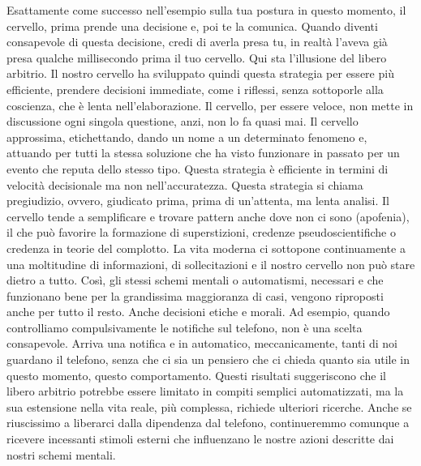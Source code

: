 \documentclass[12pt]{book} %
\begin{document}
Esattamente come successo nell'esempio sulla tua postura in questo momento, il cervello, prima
prende una decisione e, poi te la comunica. Quando diventi consapevole di questa decisione, credi di averla presa tu,
in realtà l'aveva già presa qualche millisecondo prima il tuo cervello. Qui sta
l'illusione del libero arbitrio. Il nostro cervello ha sviluppato quindi questa strategia per
essere più efficiente, prendere decisioni immediate, come i riflessi, senza sottoporle alla coscienza, che è lenta
nell'elaborazione. Il cervello, per essere veloce, non mette in discussione ogni singola
questione, anzi, non lo fa quasi mai. Il cervello approssima, etichettando, dando un nome a un determinato fenomeno e,
attuando per tutti la stessa soluzione che ha visto funzionare in passato per un evento che reputa dello stesso tipo.
Questa strategia è efficiente in termini di velocità decisionale ma non nell'accuratezza. Questa
strategia si chiama pregiudizio, ovvero, giudicato prima, prima di un'attenta, ma lenta analisi.
Il cervello tende a semplificare e trovare pattern anche dove non ci sono (apofenia), il che può favorire la formazione di superstizioni, credenze pseudoscientifiche o credenza in teorie del complotto. La vita
moderna ci sottopone continuamente a una moltitudine di informazioni, di sollecitazioni e il nostro cervello non può
stare dietro a tutto. Così, gli stessi schemi mentali o automatismi, necessari e che funzionano bene per la grandissima
maggioranza di casi, vengono riproposti anche per tutto il resto. Anche decisioni etiche e morali. 
Ad esempio, quando controlliamo compulsivamente le notifiche sul telefono, non è una scelta consapevole. Arriva una notifica e in automatico, meccanicamente, tanti di noi guardano il telefono, senza che ci sia un pensiero che ci chieda quanto sia utile in questo momento, questo comportamento. Questi risultati suggeriscono che il libero arbitrio potrebbe essere limitato in compiti semplici automatizzati, ma la sua estensione nella vita reale, più complessa, richiede ulteriori ricerche. Anche se riuscissimo a liberarci dalla dipendenza dal telefono, continueremmo comunque a ricevere incessanti stimoli esterni che influenzano le nostre azioni descritte dai nostri schemi mentali.
\end{document}
